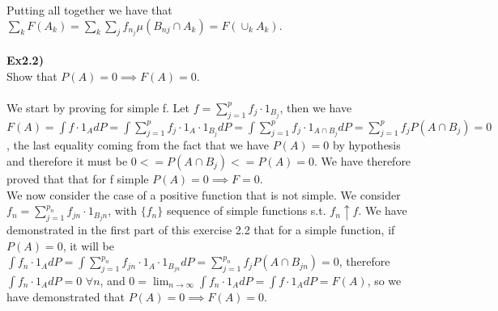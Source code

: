 \documentclass[12pt,mythesisstyle]{report}
\begin{document}
\begin{enumerate}
Putting all together we have that $\sum_k F(A_k)=\sum_k\sum_j f_{n_j}\mu(B_{nj} \cap {A_k})=F(\cup_k A_k).$
\\\\
\textbf{Ex2.2)}\\
Show that $P(A)=0\implies F(A)=0$.
\\
\\We start by proving for simple f. Let $f=\sum_{j=1}^p f_j\cdot 1_{B_j}$, then we have $F(A)=\int f\cdot 1_{A}dP=\int \sum_{j=1}^p f_j\cdot 1_A\cdot 1_{B_j}dP=\int \sum_{j=1}^p f_j\cdot 1_{A\cap B_j}dP=\sum_{j=1}^p f_jP(A\cap B_j)=0$, the last equality coming from the fact that we have $P(A)=0$ by hypothesis and therefore it must be $0<=P(A\cap B_j)<=P(A)=0$. We have therefore proved that that for f simple $P(A)=0\implies F=0$.
\\We now consider the case of a positive function that is not simple. We consider $f_n=\sum_{j=1}^{p_n} f_{jn}\cdot 1_{B_jn}$, with $\{f_n\}$ sequence of simple functions s.t. $f_n\uparrow f$. We have demonstrated in the first part of this exercise 2.2 that for a simple function, if $P(A)=0$, it will be $\int f_n\cdot 1_{A}dP=\int \sum_{j=1}^{p_n} f_{jn}\cdot 1_A\cdot 1_{B_{jn}}dP=\sum_{j=1}^{p_n} f_jP(A\cap B_{jn})=0$, therefore $\int f_n\cdot 1_{A}dP=0$ $\forall n$, and $0=\lim_{n \to \infty}\int f_n\cdot 1_{A}dP=\int f\cdot 1_{A}dP=F(A)$, so we have demonstrated that $P(A)=0\implies F(A)=0$.

\end{enumerate}
\end{document}
